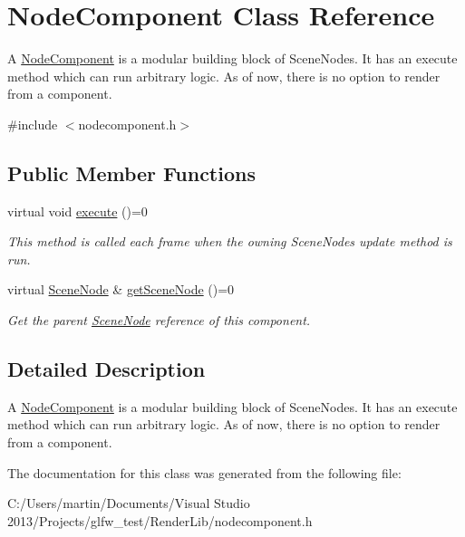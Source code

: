 \hypertarget{class_node_component}{}\section{Node\+Component Class Reference}
\label{class_node_component}


A \hyperlink{class_node_component}{Node\+Component} is a modular building block of Scene\+Nodes. It has an execute method which can run arbitrary logic. As of now, there is no option to render from a component.  




{\ttfamily \#include $<$nodecomponent.\+h$>$}

\subsection*{Public Member Functions}
\begin{DoxyCompactItemize}
\item 
\mbox{\label{class_node_component_a3a3a569f380b8f8e52252b1a4c8ceccf}} 
virtual void \hyperlink{class_node_component_a3a3a569f380b8f8e52252b1a4c8ceccf}{execute} ()=0
\begin{DoxyCompactList}\small\item\em This method is called each frame when the owning Scene\+Nodes update method is run. \end{DoxyCompactList}\item 
\mbox{\label{class_node_component_a389e825b338a11798186848ce972c62f}} 
virtual \hyperlink{class_scene_node}{Scene\+Node} \& \hyperlink{class_node_component_a389e825b338a11798186848ce972c62f}{get\+Scene\+Node} ()=0
\begin{DoxyCompactList}\small\item\em Get the parent \hyperlink{class_scene_node}{Scene\+Node} reference of this component. \end{DoxyCompactList}\end{DoxyCompactItemize}


\subsection{Detailed Description}
A \hyperlink{class_node_component}{Node\+Component} is a modular building block of Scene\+Nodes. It has an execute method which can run arbitrary logic. As of now, there is no option to render from a component. 

The documentation for this class was generated from the following file\+:\begin{DoxyCompactItemize}
\item 
C\+:/\+Users/martin/\+Documents/\+Visual Studio 2013/\+Projects/glfw\+\_\+test/\+Render\+Lib/nodecomponent.\+h\end{DoxyCompactItemize}
